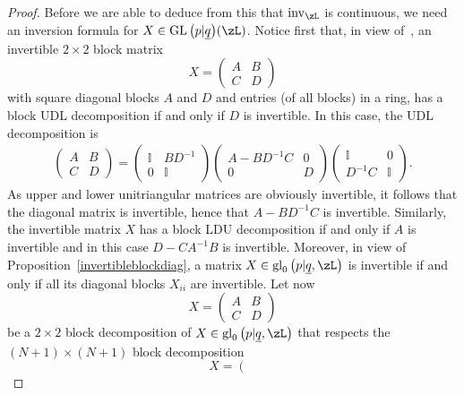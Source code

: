 \documentclass[10pt,a4paper]{amsart}
\newcommand{\op}[1]{\operatorname{#1}}
\def\ul{\underline}
\def\ul{\underline}
\newcommand{\0}{\otimes}
\numberwithin{equation}{section}
\begin{document}
\begin{proof}
Before we are able to deduce from this that $\op{inv}_\zL$ is continuous, we need an inversion formula for $X\in\op{GL}\big(p|\ul q\big)(\zL)$. Notice first that, in view of~\cite[Proposition 4.7]{Covolo:2012}, an invertible $2\times 2$ block matrix
\begin{equation*}
X =\begin{pmatrix}
 A & B\\
 C & D
\end{pmatrix}
\end{equation*}
with square diagonal blocks $A$ and $D$ and entries (of all blocks) in a ring, has a block UDL decomposition if and only if $D$ is invertible. In this case, the UDL decomposition is
\begin{gather*} %
\begin{pmatrix} A & B \\[2pt] C & D\end{pmatrix}
= \begin{pmatrix} \mathbb{I} & BD^{-1}\\[2pt] 0 & \mathbb{I}\end{pmatrix}
\begin{pmatrix} A-BD^{-1}C & 0 \\[2pt] 0 & D\end{pmatrix}
\begin{pmatrix} \mathbb{I} & 0 \\[2pt] D^{-1}C & \mathbb{I}\end{pmatrix}\!.
\end{gather*}
As upper and lower unitriangular matrices are obviously invertible, it follows that the diagonal matrix is invertible, hence that $A-BD^{-1}C$ is invertible. Similarly, the invertible matrix $X$ has a block LDU decomposition if and only if $A$ is invertible and in this case $D-CA^{-1}B$ is invertible. Moreover, in view of Proposition~\ref{invertibleblockdiag}, a matrix $X\in\op{gl}_0\big(p|\ul q,\zL\big)$ is invertible if and only if all its diagonal blocks $X_{ii}$ are invertible. Let now
\begin{equation*}
X =\begin{pmatrix}
 A & B\\
 C & D
\end{pmatrix}
\end{equation*}
be a $2\times 2$ block decomposition of $X\in\op{gl}_0\big(p|\ul q,\zL\big)$ that respects the $(N+1)\times (N+1)$ block decomposition
\begin{equation*}
X = \left(\begin{array}{c|c|c}

\end{array}
\end{equation*}
\end{proof}
\end{document}
